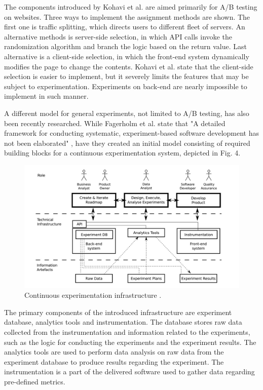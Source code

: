 \documentclass[english]{tktltiki2}
\theoremstyle{definition}
\theoremstyle{remark}
\begin{document}
The components introduced by Kohavi et al. are aimed primarily for A/B testing on websites. Three ways to implement the assignment methods are shown. The first one is traffic splitting, which directs users to different fleet of servers. An alternative methods is server-side selection, in which API calls invoke the randomization algorithm and branch the logic based on the return value. Last alternative is a client-side selection, in which the front-end system dynamically modifies the page to change the contents. Kohavi et al. state that the client-side selection is easier to implement, but it severely limits the features that may be subject to experimentation. Experiments on back-end are nearly impossible to implement in such manner.

A different model for general experiments, not limited to A/B testing, has also been recently researched. While Fagerholm et al. state that "A detailed framework for conducting systematic, experiment-based software development has not been elaborated" \cite{fagerholm2014building}, have they created an initial model consisting of required building blocks for a continuous experimentation system, depicted in Fig. 4. 

\begin{figure}[h]
	\centering
	\includegraphics[width=5in]{infra.jpg}
	\caption{Continuous experimentation infrastructure \cite{fagerholm2014building}.}
	\label{fig4}
\end{figure}

The primary components of the introduced infrastructure are experiment database, analytics tools and instrumentation. The database stores raw data collected from the instrumentation and information related to the experiments, such as the logic for conducting the experiments and the experiment results. The analytics tools are used to perform data analysis on raw data from the experiment database to produce results regarding the experiment. The instrumentation is a part of the delivered software used to gather data regarding pre-defined metrics.   
\end{document}
